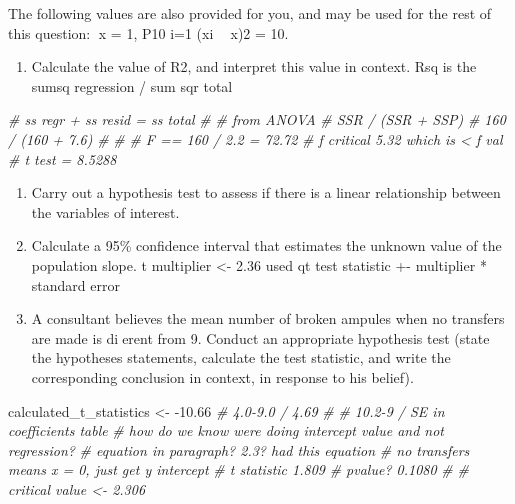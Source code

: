\documentclass[
]{article}
\newenvironment{Shaded}{\begin{snugshade}}{\end{snugshade}}
\newcommand{\CommentTok}[1]{\textcolor[rgb]{0.56,0.35,0.01}{\textit{#1}}}
\newcommand{\FloatTok}[1]{\textcolor[rgb]{0.00,0.00,0.81}{#1}}
\newcommand{\NormalTok}[1]{#1}
\newcommand{\StringTok}[1]{\textcolor[rgb]{0.31,0.60,0.02}{#1}}
\providecommand{\tightlist}{%
  \setlength{\itemsep}{0pt}\setlength{\parskip}{0pt}}
\begin{document}
The following values are also provided for you, and may be used for the
rest of this question: x = 1, P10 i=1 (xi 􀀀 x)2 = 10.

\begin{enumerate}
\def\labelenumi{(\alph{enumi})}
\tightlist
\item
  Calculate the value of R2, and interpret this value in context. Rsq is
  the sumsq regression / sum sqr total
\end{enumerate}

\begin{Shaded}
\begin{Highlighting}[]
\CommentTok{\# ss regr + ss resid = ss total }
\CommentTok{\# }
\CommentTok{\# from ANOVA }
\CommentTok{\#   SSR / (SSR + SSP)}
\CommentTok{\#   160 / (160 + 7.6)}
\CommentTok{\#   }
\CommentTok{\#   }
\CommentTok{\#   F == 160 / 2.2 = 72.72}
\CommentTok{\#     f critical 5.32 which is \textless{} f val}
\CommentTok{\#   t test = 8.5288}
\end{Highlighting}
\end{Shaded}

\begin{enumerate}
\def\labelenumi{(\alph{enumi})}
\setcounter{enumi}{1}
\item
  Carry out a hypothesis test to assess if there is a linear
  relationship between the variables of interest.
\item
  Calculate a 95\% confidence interval that estimates the unknown value
  of the population slope. t multiplier \textless- 2.36 used qt test
  statistic +- multiplier * standard error
\item
  A consultant believes the mean number of broken ampules when no
  transfers are made is dierent from 9. Conduct an appropriate
  hypothesis test (state the hypotheses statements, calculate the test
  statistic, and write the corresponding conclusion in context, in
  response to his belief).
\end{enumerate}

\begin{Shaded}
\begin{Highlighting}[]
\NormalTok{calculated\_t\_statistics \textless{}{-}}\StringTok{ }\FloatTok{{-}10.66}
\CommentTok{\# 4.0{-}9.0 / 4.69}
\CommentTok{\# }
\CommentTok{\# 10.2{-}9 /  SE in coefficients table}
\CommentTok{\# how do we know we\textquotesingle{}re doing intercept value and not regression?}
\CommentTok{\# equation in paragraph? 2.3? had this equation}
\CommentTok{\# no transfers means x = 0, just get y intercept }
\CommentTok{\# t statistic 1.809}
\CommentTok{\# pvalue? 0.1080}
\CommentTok{\# }
\CommentTok{\# critical value \textless{}{-} 2.306}
\end{Highlighting}
\end{Shaded}
\end{document}
